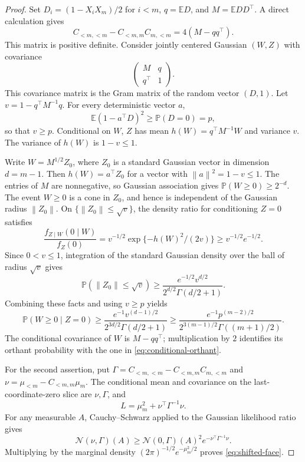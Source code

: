 \documentclass[11pt]{article}
\theoremstyle{remark}\newtheorem{remark}[theorem]{Remark}
\newcommand{\E}{\mathbb E}
\newcommand{\Pp}{\mathbb P}
\newcommand{\cN}{\mathcal N}
\newcommand{\norm}[1]{\left\lVert #1\right\rVert}
\begin{document}
\begin{proof}
Set $D_i=(1-X_iX_m)/2$ for $i<m$, $q=\E D$, and $M=\E DD^\top$.
A direct calculation gives
\[
 C_{<m,<m}-C_{<m,m}C_{m,<m}=4(M-qq^\top).
\]
This matrix is positive definite. Consider jointly centered Gaussian
$(W,Z)$ with covariance
\[
 \begin{pmatrix} M&q\\q^\top&1\end{pmatrix}.
\]
This covariance matrix is the Gram matrix of the random vector $(D,1)$.
Let $v=1-q^\top M^{-1}q$. For every deterministic vector $a$,
\[
 \E(1-a^\top D)^2\ge\Pp(D=0)=p,
\]
so that $v\ge p$. Conditional on $W$,
$Z$ has mean $h(W)=q^\top M^{-1}W$ and variance $v$.
The variance of $h(W)$ is $1-v\le1$.

Write $W=M^{1/2}Z_0$, where $Z_0$ is a standard Gaussian vector
in dimension $d=m-1$. Then $h(W)=a^\top Z_0$ for a vector with
$\norm a^2=1-v\le1$. The entries of $M$ are nonnegative, so Gaussian
association gives $\Pp(W\ge0)\ge2^{-d}$. The event $W\ge0$ is a cone
in $Z_0$, and hence is independent of the Gaussian radius $\norm{Z_0}$.
On $\{\norm{Z_0}\le\sqrt v\}$, the density ratio for conditioning $Z=0$
satisfies
\[
 \frac{f_{Z\mid W}(0\mid W)}{f_Z(0)}
 =v^{-1/2}\exp\{-h(W)^2/(2v)\}\ge v^{-1/2}e^{-1/2}.
\]
Since $0<v\le1$, integration of the standard Gaussian density over the
ball of radius $\sqrt v$ gives
\[
 \Pp(\norm{Z_0}\le\sqrt v)
 \ge \frac{e^{-1/2}v^{d/2}}{2^{d/2}\Gamma(d/2+1)}.
\]
Combining these facts and using $v\ge p$ yields
\[
 \Pp(W\ge0\mid Z=0)
 \ge \frac{e^{-1}v^{(d-1)/2}}{2^{3d/2}\Gamma(d/2+1)}
 \ge \frac{e^{-1}p^{(m-2)/2}}
             {2^{3(m-1)/2}\Gamma((m+1)/2)}.
\]
The conditional covariance of $W$ is $M-qq^\top$; multiplication by $2$
identifies its orthant probability with the one in
\eqref{eq:conditional-orthant}.

For the second assertion, put
$\Gamma=C_{<m,<m}-C_{<m,m}C_{m,<m}$ and
$\nu=\mu_{<m}-C_{<m,m}\mu_m$.
The conditional mean and covariance on the last-coordinate-zero slice
are $\nu,\Gamma$, and
\[
 L=\mu_m^2+\nu^\top\Gamma^{-1}\nu.
\]
For any measurable $A$, Cauchy--Schwarz applied to the Gaussian
likelihood ratio gives
\[
 \cN(\nu,\Gamma)(A)
 \ge \cN(0,\Gamma)(A)^2
       e^{-\nu^\top\Gamma^{-1}\nu}.
\]
Multiplying by the marginal density
$(2\pi)^{-1/2}e^{-\mu_m^2/2}$ proves \eqref{eq:shifted-face}.
\end{proof}
\end{document}
